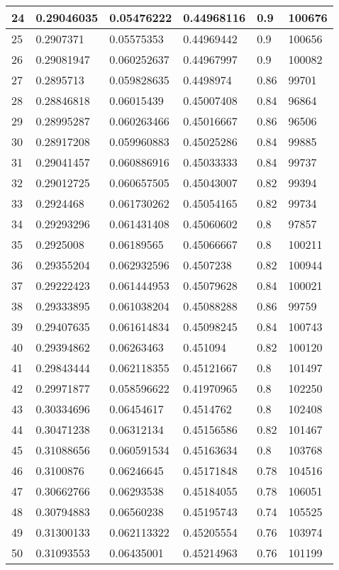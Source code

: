 \begin{longtable}{|l|l|l|l|l|l|}
24 & 0.29046035 & 0.05476222 & 0.44968116 & 0.9 & 100676 \\ \hline 
25 & 0.2907371 & 0.05575353 & 0.44969442 & 0.9 & 100656 \\ \hline 
26 & 0.29081947 & 0.060252637 & 0.44967997 & 0.9 & 100082 \\ \hline 
27 & 0.2895713 & 0.059828635 & 0.4498974 & 0.86 & 99701 \\ \hline 
28 & 0.28846818 & 0.06015439 & 0.45007408 & 0.84 & 96864 \\ \hline 
29 & 0.28995287 & 0.060263466 & 0.45016667 & 0.86 & 96506 \\ \hline 
30 & 0.28917208 & 0.059960883 & 0.45025286 & 0.84 & 99885 \\ \hline 
31 & 0.29041457 & 0.060886916 & 0.45033333 & 0.84 & 99737 \\ \hline 
32 & 0.29012725 & 0.060657505 & 0.45043007 & 0.82 & 99394 \\ \hline 
33 & 0.2924468 & 0.061730262 & 0.45054165 & 0.82 & 99734 \\ \hline 
34 & 0.29293296 & 0.061431408 & 0.45060602 & 0.8 & 97857 \\ \hline 
35 & 0.2925008 & 0.06189565 & 0.45066667 & 0.8 & 100211 \\ \hline 
36 & 0.29355204 & 0.062932596 & 0.4507238 & 0.82 & 100944 \\ \hline 
37 & 0.29222423 & 0.061444953 & 0.45079628 & 0.84 & 100021 \\ \hline 
38 & 0.29333895 & 0.061038204 & 0.45088288 & 0.86 & 99759 \\ \hline 
39 & 0.29407635 & 0.061614834 & 0.45098245 & 0.84 & 100743 \\ \hline 
40 & 0.29394862 & 0.06263463 & 0.451094 & 0.82 & 100120 \\ \hline 
41 & 0.29843444 & 0.062118355 & 0.45121667 & 0.8 & 101497 \\ \hline 
42 & 0.29971877 & 0.058596622 & 0.41970965 & 0.8 & 102250 \\ \hline 
43 & 0.30334696 & 0.06454617 & 0.4514762 & 0.8 & 102408 \\ \hline 
44 & 0.30471238 & 0.06312134 & 0.45156586 & 0.82 & 101467 \\ \hline 
45 & 0.31088656 & 0.060591534 & 0.45163634 & 0.8 & 103768 \\ \hline 
46 & 0.3100876 & 0.06246645 & 0.45171848 & 0.78 & 104516 \\ \hline 
47 & 0.30662766 & 0.06293538 & 0.45184055 & 0.78 & 106051 \\ \hline 
48 & 0.30794883 & 0.06560238 & 0.45195743 & 0.74 & 105525 \\ \hline 
49 & 0.31300133 & 0.062113322 & 0.45205554 & 0.76 & 103974 \\ \hline 
50 & 0.31093553 & 0.06435001 & 0.45214963 & 0.76 & 101199 \\ \hline 
\end{longtable}